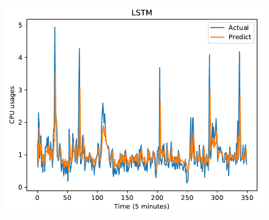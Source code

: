\documentclass[11pt,twoside]{article}
\begin{document}
\begin{multicols}{2}
\begin{figure}[!ht]
\begin{minipage}[b]{0.33\linewidth}
    \includegraphics[width=0.9\linewidth]{images/pdf/predict/k2/cpu_k2_lstm.pdf} 
  \end{minipage} 
  

\end{figure}
\end{multicols}
\end{document}
